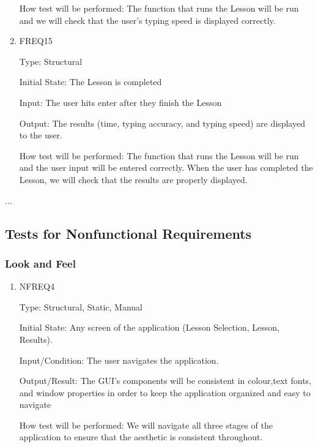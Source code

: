 \documentclass[12pt, titlepage]{article}
\begin{document}
\begin{enumerate}
How test will be performed:  The function that runs the Lesson will be run and we will check that the user's typing speed is displayed correctly.  

\item{FREQ15\\}

Type: Structural
					
Initial State: The Lesson is completed
					
Input: The user hits enter after they finish the Lesson
					
Output: The results (time, typing accuracy, and typing speed) are displayed to the user.
		
How test will be performed: The function that runs the Lesson will be run and the user input will be entered correctly. When the user has completed the Lesson, we will check that the results are properly displayed.

\end{enumerate}
...

\subsection{Tests for Nonfunctional Requirements}

\subsubsection{Look and Feel}

\begin{enumerate}

\item{NFREQ4}

Type: Structural, Static, Manual
					
Initial State: Any screen of the application (Lesson Selection, Lesson, Results).
					
Input/Condition: The user navigates the application.
					
Output/Result: The GUI’s components will be consistent in colour,text  fonts,  and  window  properties  in  order  to  keep the application organized and easy to navigate
					
How test will be performed: We will navigate all three stages of the application to ensure that the aesthetic is consistent throughout.

\end{enumerate}
\end{document}
